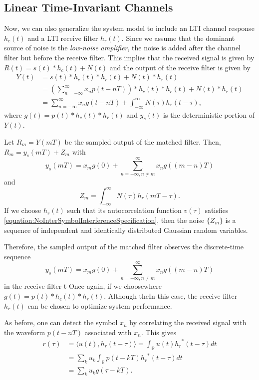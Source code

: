 \subsection{Linear Time-Invariant Channels}

Now, we can also generalize the system model to include an LTI channel response $h_c (t)$ and a LTI receive filter $h_r (t)$.
Since we assume that the dominant source of noise is the \emph{low-noise amplifier}, the noise is added after the channel filter but before the receive filter.
This implies that the received signal is given by $R(t) = s(t) * h_c(t) + N(t)$ and the output of the receive filter is given by
\begin{align*}
Y(t)
&= s(t) * h_c (t) * h_r (t) + N(t) * h_r(t) \\
&= \left( \sum_{n = -\infty}^{\infty} x_n p (t - nT) \right) * h_c (t) * h_r (t) + N(t) * h_r(t) \\
&= \sum_{n = -\infty}^{\infty} x_n g(t - nT) + \int_{-\infty}^{\infty} N(\tau) h_r (t-\tau),
\end{align*}
where $g(t) = p (t) * h_c (t) * h_r (t)$ and $y_s (t)$ %
is the deterministic portion of $Y(t)$.

Let $R_m = Y(mT)$ be the sampled output of the matched filter.
Then, $R_m = y_s (mT) + Z_m$ with
\begin{equation*}
y_s (mT) = x_m g(0) + \sum_{n=-\infty,n \neq m}^{\infty} x_n g\left( (m - n)T \right)
\end{equation*}
and
\[ Z_m = \int_{-\infty}^{\infty} N(\tau) h_r (mT-\tau). \]
If we choose $h_r (t)$ such that its autocorrelation function $v(\tau)$ satisfies \eqref{equation:NoInterSymbolInterferenceSpecification}, then the noise $\{ Z_m \}$ is a sequence of independent and identically distributed Gaussian random variables.

\iffalse
Therefore, the sampled output of the matched filter observes the discrete-time sequence
\begin{equation*}
y_s (mT) = x_m g(0) + \sum_{n=-\infty,n \neq m}^{\infty} x_n g\left( (m - n)T \right)
\end{equation*}
in 
the receive filter t
Once again, if we choosewhere $g(t) = p (t) * h_c (t) * h_r (t)$.
Although theIn this case, the receive filter $h_r (t)$ can be chosen to optimize system performance.

As before, one can detect the symbol $x_n$  by correlating the received signal with the waveform $p(t-nT)$ associated with $x_n$.
This gives
\begin{equation} \label{equation:InnerProductReceiver}
\begin{split}
r(\tau) &= \langle u(t), h_r (t-\tau) \rangle
= \int_{\mathbb{R}} u(t) {h_r}^*(t-\tau) dt \\
&= \sum_{k} u_k \int_{\mathbb{R}} p(t - kT) {h_r}^*(t-\tau) dt \\
&= \sum_{k} u_k g(\tau - kT) .
\end{split}
\end{equation}


